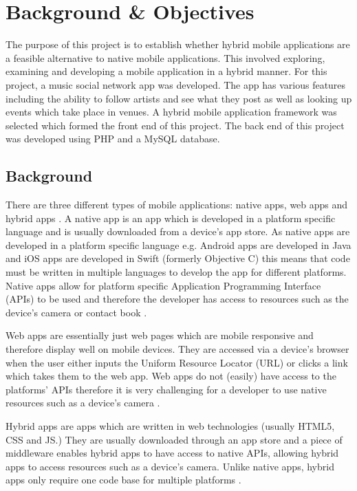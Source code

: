 \chapter{Background \& Objectives}

The purpose of this project is to establish whether hybrid mobile applications are a feasible alternative to native mobile applications. This involved exploring, examining and developing a mobile application in a hybrid manner. For this project, a music social network app was developed. The app has various features including the ability to follow artists and see what they post as well as looking up events which take place in venues. A hybrid mobile application framework was selected which formed the front end of this project. The back end of this project was developed using PHP and a MySQL database.

\section{Background}
There are three different types of mobile applications: native apps, web apps and  hybrid apps \cite{IIA} \cite{BAB} \cite{PTA}. A native app is an app which is developed in a platform specific language and is usually downloaded from a device's app store. As native apps are developed in a platform specific language e.g. Android apps are developed in Java \cite{AD} and iOS apps are developed in Swift (formerly Objective C) \cite{ID} this means that code must be written in multiple languages to develop the app for different platforms. Native apps allow for platform specific Application Programming Interface (APIs) to be used and therefore the developer has access to resources such as the device's camera or contact book \cite{drupal} \cite{MAC} .

Web apps are essentially just web pages which are mobile responsive and therefore display well on mobile devices. They are accessed via a device's browser when the user either inputs the Uniform Resource Locator (URL) or clicks a link which takes them to the web app. Web apps do not (easily) have access to the platforms' APIs therefore it is very challenging for a developer to use native resources such as a device's camera \cite{BAB} \cite{MAC}.

Hybrid apps are apps which are written in web technologies (usually HTML5, CSS and JS.) They are usually downloaded through an app store and a piece of middleware enables hybrid apps to have access to native APIs, allowing hybrid apps to access resources such as a device's camera. Unlike native apps, hybrid apps only require one code base for multiple platforms\cite{SF} \cite{MAC}.

